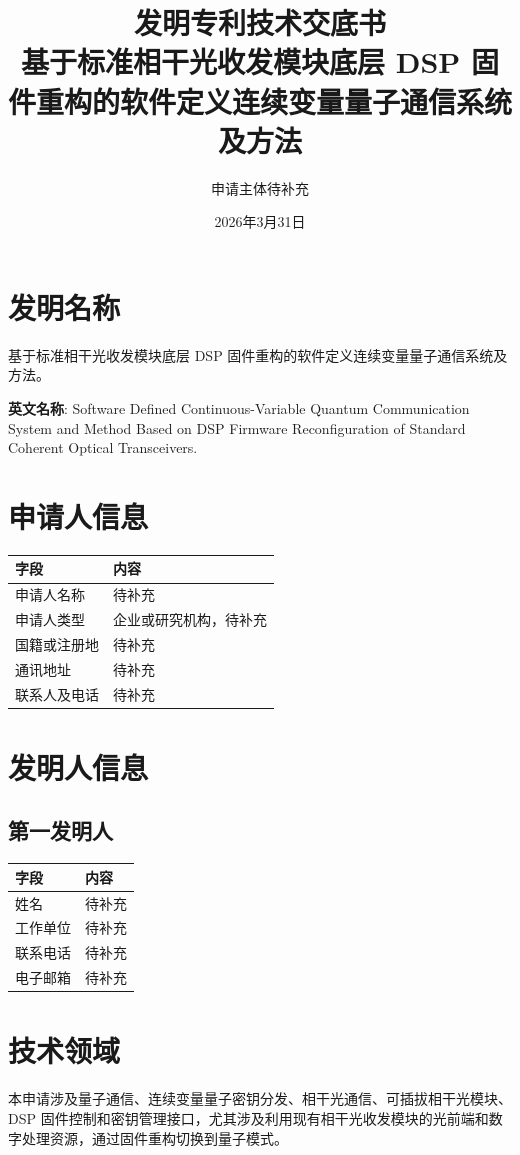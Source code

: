 ﻿\documentclass[12pt,a4paper]{article}
\title{\textbf{发明专利技术交底书}\\[0.5em]\Large 基于标准相干光收发模块底层 DSP 固件重构的软件定义连续变量量子通信系统及方法}
\author{申请主体待补充}
\date{2026年3月31日}
\begin{document}
\maketitle
\tableofcontents
\newpage
\section{发明名称}
基于标准相干光收发模块底层 DSP 固件重构的软件定义连续变量量子通信系统及方法。

\textbf{英文名称}: Software Defined Continuous-Variable Quantum Communication System and Method Based on DSP Firmware Reconfiguration of Standard Coherent Optical Transceivers.

\section{申请人信息}
\begin{tabular}{|p{4cm}|p{8cm}|}
\hline
字段 & 内容 \\
\hline
申请人名称 & 待补充 \\
\hline
申请人类型 & 企业或研究机构，待补充 \\
\hline
国籍或注册地 & 待补充 \\
\hline
通讯地址 & 待补充 \\
\hline
联系人及电话 & 待补充 \\
\hline
\end{tabular}

\section{发明人信息}
\subsection{第一发明人}
\begin{tabular}{|p{4cm}|p{8cm}|}
\hline
字段 & 内容 \\
\hline
姓名 & 待补充 \\
\hline
工作单位 & 待补充 \\
\hline
联系电话 & 待补充 \\
\hline
电子邮箱 & 待补充 \\
\hline
\end{tabular}

\section{技术领域}
本申请涉及量子通信、连续变量量子密钥分发、相干光通信、可插拔相干光模块、DSP 固件控制和密钥管理接口，尤其涉及利用现有相干光收发模块的光前端和数字处理资源，通过固件重构切换到量子模式。
\end{document}
